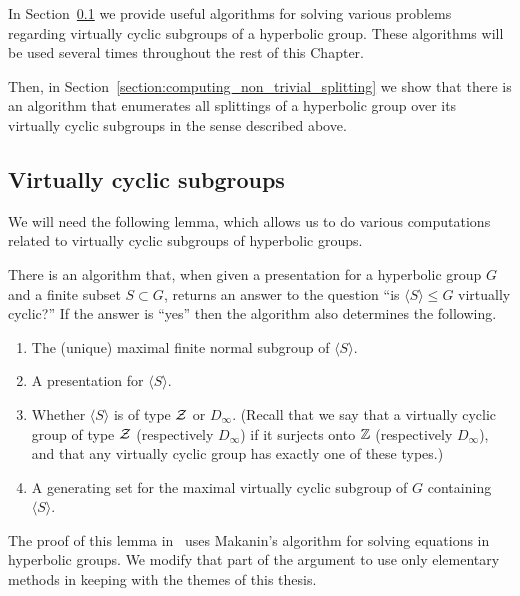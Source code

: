 In Section~\ref{section:virtually_cyclic_subgroups_algorithms} we provide useful algorithms for solving various problems regarding virtually cyclic subgroups of a hyperbolic group.
These algorithms will be used several times throughout the rest of this Chapter.

Then, in Section~\ref{section:computing_non_trivial_splitting} we show that there is an algorithm that enumerates all splittings of a hyperbolic group over its virtually cyclic subgroups in the sense described above.

\subsection{Virtually cyclic subgroups}\label{section:virtually_cyclic_subgroups_algorithms}

We will need the following lemma, which allows us to do various computations related to virtually cyclic subgroups of hyperbolic groups.

\begin{lemma}\cite[Lemma 2.8]{dahmaniguirardel11}\label{lemma:virtually_cyclic_subgroups}
  There is an algorithm that, when given a presentation for a hyperbolic group $G$ and a finite subset $S \subset G$, returns an answer to the question ``is $\langle S \rangle \leq G$ virtually cyclic?''
  If the answer is ``yes'' then the algorithm also determines the following.
  \begin{enumerate}
    \item The (unique) maximal finite normal subgroup of $\langle S \rangle$. 
    \item A presentation for $\langle S\rangle$.
    \item Whether $\langle S \rangle$ is of type $\mathcal{Z}$ or $D_\infty$.
      (Recall that we say that a virtually cyclic group of type $\mathcal{Z}$ (respectively $D_\infty$) if it surjects onto $\mathbb{Z}$ (respectively $D_\infty$), and that any virtually cyclic group has exactly one of these types.)
    \item A generating set for the maximal virtually cyclic subgroup of $G$ containing $\langle S\rangle$.\end{enumerate}
\end{lemma}

The proof of this lemma in~\cite{dahmaniguirardel11} uses Makanin's algorithm for solving equations in hyperbolic groups. 
We modify that part of the argument to use only elementary methods in keeping with the themes of this thesis.

